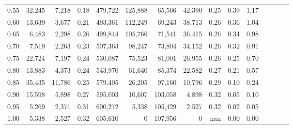 \begin{tabular}{rrrcrrrrrrrrrrr}
0.55 &  32,245 &   7,218 &                                       0.18 &  479,722 &  125,888 &   65,566 &   42,390 &  0.25 &  0.39 &                         1.17 \\
0.60 &  13,639 &   3,677 &                                       0.21 &  493,361 &  112,249 &   69,243 &   38,713 &  0.26 &  0.36 &                         1.04 \\
0.65 &   6,483 &   2,298 &                                       0.26 &  499,844 &  105,766 &   71,541 &   36,415 &  0.26 &  0.34 &                         0.98 \\
0.70 &   7,519 &   2,263 &                                       0.23 &  507,363 &   98,247 &   73,804 &   34,152 &  0.26 &  0.32 &                         0.91 \\
0.75 &  22,724 &   7,197 &                                       0.24 &  530,087 &   75,523 &   81,001 &   26,955 &  0.26 &  0.25 &                         0.70 \\
0.80 &  13,883 &   4,373 &                                       0.24 &  543,970 &   61,640 &   85,374 &   22,582 &  0.27 &  0.21 &                         0.57 \\
0.85 &  35,435 &  11,786 &                                       0.25 &  579,405 &   26,205 &   97,160 &   10,796 &  0.29 &  0.10 &                         0.24 \\
0.90 &  15,598 &   5,898 &                                       0.27 &  595,003 &   10,607 &  103,058 &    4,898 &  0.32 &  0.05 &                         0.10 \\
0.95 &   5,269 &   2,371 &                                       0.31 &  600,272 &    5,338 &  105,429 &    2,527 &  0.32 &  0.02 &                         0.05 \\
1.00 &   5,338 &   2,527 &                                       0.32 &  605,610 &        0 &  107,956 &        0 &   nan &  0.00 &                         0.00 \\
\bottomrule
\end{tabular}
